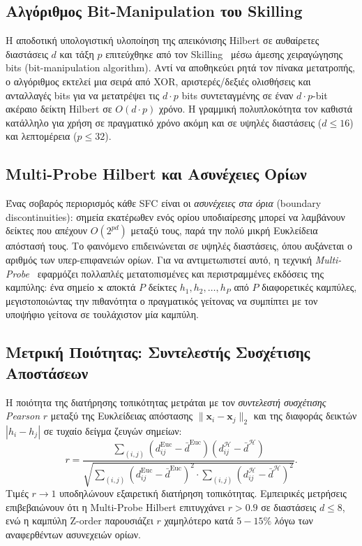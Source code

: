 \subsection*{Αλγόριθμος Bit-Manipulation του Skilling}

Η αποδοτική υπολογιστική υλοποίηση της απεικόνισης Hilbert σε αυθαίρετες διαστάσεις $d$ και τάξη $p$ επιτεύχθηκε από τον Skilling~\cite{skilling2004hilbert} μέσω άμεσης χειραγώγησης bits (bit-manipulation algorithm). Αντί να αποθηκεύει ρητά τον πίνακα μετατροπής, ο αλγόριθμος εκτελεί μια σειρά από XOR, αριστερές/δεξιές ολισθήσεις και ανταλλαγές bits για να μετατρέψει τις $d \cdot p$ bits συντεταγμένης σε έναν $d \cdot p$-bit ακέραιο δείκτη Hilbert σε $O(d \cdot p)$ χρόνο. Η γραμμική πολυπλοκότητα τον καθιστά κατάλληλο για χρήση σε πραγματικό χρόνο ακόμη και σε υψηλές διαστάσεις ($d \leq 16$) και λεπτομέρεια ($p \leq 32$).

\subsection*{Multi-Probe Hilbert και Ασυνέχειες Ορίων}

Ένας σοβαρός περιορισμός κάθε SFC είναι οι \textit{ασυνέχειες στα όρια} (boundary discontinuities): σημεία εκατέρωθεν ενός ορίου υποδιαίρεσης μπορεί να λαμβάνουν δείκτες που απέχουν $O(2^{pd})$ μεταξύ τους, παρά την πολύ μικρή Ευκλείδεια απόστασή τους. Το φαινόμενο επιδεινώνεται σε υψηλές διαστάσεις, όπου αυξάνεται ο αριθμός των υπερ-επιφανειών ορίων. Για να αντιμετωπιστεί αυτό, η τεχνική \textit{Multi-Probe}~\cite{lv2007multiprobe} εφαρμόζει πολλαπλές μετατοπισμένες και περιστραμμένες εκδόσεις της καμπύλης: ένα σημείο $\bm{x}$ αποκτά $P$ δείκτες $h_1, h_2, \ldots, h_P$ από $P$ διαφορετικές καμπύλες, μεγιστοποιώντας την πιθανότητα ο πραγματικός γείτονας να συμπίπτει με τον υποψήφιο γείτονα σε τουλάχιστον μία καμπύλη.

\subsection*{Μετρική Ποιότητας: Συντελεστής Συσχέτισης Αποστάσεων}

Η ποιότητα της διατήρησης τοπικότητας μετράται με τον \textit{συντελεστή συσχέτισης Pearson} $r$ μεταξύ της Ευκλείδειας απόστασης $\|\bm{x}_i - \bm{x}_j\|_2$ και της διαφοράς δεικτών $|h_i - h_j|$ σε τυχαίο δείγμα ζευγών σημείων:
\begin{equation}
    r = \frac{\sum_{(i,j)}(d^{\text{Euc}}_{ij} - \bar{d}^{\text{Euc}})(d^{\mathcal{H}}_{ij} - \bar{d}^{\mathcal{H}})}{\sqrt{\sum_{(i,j)}(d^{\text{Euc}}_{ij} - \bar{d}^{\text{Euc}})^2\cdot\sum_{(i,j)}(d^{\mathcal{H}}_{ij} - \bar{d}^{\mathcal{H}})^2}}.
\end{equation}
Τιμές $r \to 1$ υποδηλώνουν εξαιρετική διατήρηση τοπικότητας. Εμπειρικές μετρήσεις επιβεβαιώνουν ότι η Multi-Probe Hilbert επιτυγχάνει $r > 0.9$ σε διαστάσεις $d \leq 8$, ενώ η καμπύλη Z-order παρουσιάζει $r$ χαμηλότερο κατά $5{-}15\%$ λόγω των αναφερθέντων ασυνεχειών ορίων.

